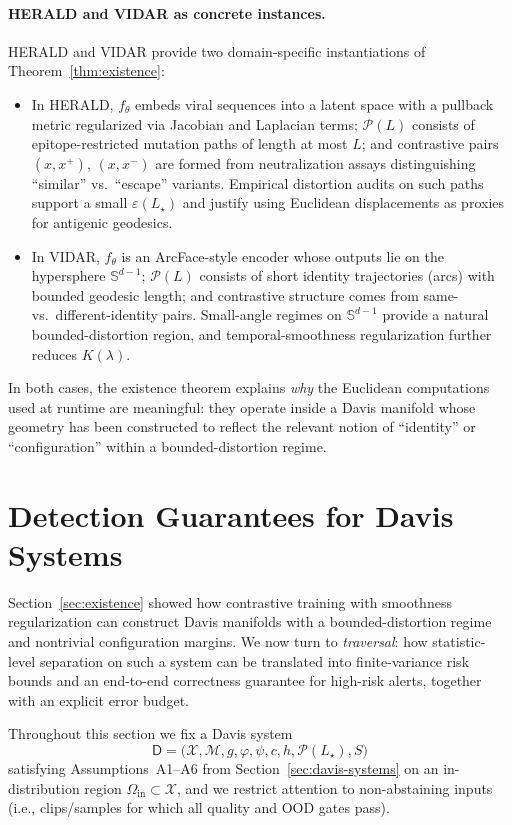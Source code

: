 \documentclass[11pt]{article}
\begin{document}
\paragraph{HERALD and VIDAR as concrete instances.}
HERALD and VIDAR provide two domain-specific instantiations of Theorem~\ref{thm:existence}:
\begin{itemize}
  \item In HERALD, $f_\theta$ embeds viral sequences into a latent space with a pullback metric
    regularized via Jacobian and Laplacian terms; $\mathcal{P}(L)$ consists of epitope-restricted
    mutation paths of length at most $L$; and contrastive pairs $(x,x^+)$, $(x,x^-)$ are formed
    from neutralization assays distinguishing ``similar'' vs.\ ``escape'' variants. Empirical
    distortion audits on such paths support a small $\varepsilon(L_\star)$ and justify using
    Euclidean displacements as proxies for antigenic geodesics.
  \item In VIDAR, $f_\theta$ is an ArcFace-style encoder whose outputs lie on the hypersphere
    $\mathbb{S}^{d-1}$; $\mathcal{P}(L)$ consists of short identity trajectories (arcs) with bounded
    geodesic length; and contrastive structure comes from same- vs.\ different-identity pairs.
    Small-angle regimes on $\mathbb{S}^{d-1}$ provide a natural bounded-distortion region, and
    temporal-smoothness regularization further reduces $K(\lambda)$.
\end{itemize}
In both cases, the existence theorem explains \emph{why} the Euclidean computations used at
runtime are meaningful: they operate inside a Davis manifold whose geometry has been constructed
to reflect the relevant notion of ``identity'' or ``configuration'' within a bounded-distortion regime.
\section{Detection Guarantees for Davis Systems}
\label{sec:theory2}

Section~\ref{sec:existence} showed how contrastive training with smoothness regularization can
construct Davis manifolds with a bounded-distortion regime and nontrivial configuration margins.
We now turn to \emph{traversal}: how statistic-level separation on such a system can be translated
into finite-variance risk bounds and an end-to-end correctness guarantee for high-risk alerts,
together with an explicit error budget.

Throughout this section we fix a Davis system
\[
\mathsf{D} = \bigl( \mathcal{X}, \mathcal{M}, g, \varphi, \psi, c, h, \mathcal{P}(L_\star), S \bigr)
\]
satisfying Assumptions~A1–A6 from Section~\ref{sec:davis-systems} on an in-distribution region
$\Omega_{\mathrm{in}} \subset \mathcal{X}$, and we restrict attention to non-abstaining inputs
(i.e., clips/samples for which all quality and OOD gates pass).
\end{document}
